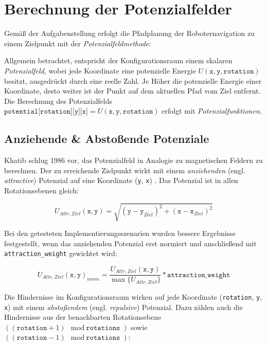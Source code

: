 \chapter{Berechnung der Potenzialfelder}

Gemäß der Aufgabenstellung erfolgt die Pfadplanung der Roboternavigation zu einem Zielpunkt mit der \textit{Potenzialfeldmethode}:

Allgemein betrachtet, entspricht der Konfigurationsraum einem skalaren \textit{Potenzialfeld}, wobei jede Koordinate eine potenzielle Energie $U(\texttt{x}, \texttt{y}, \texttt{rotation})$ besitzt, ausgedrückt durch eine reelle Zahl.
Je Höher die potenzielle Energie einer Koordinate, desto weiter ist der Punkt auf dem aktuellen Pfad vom Ziel entfernt.
\cite{yujiang.2017}
Die Berechnung des Potenzialfelds $\texttt{potential[rotation][y][x]} = U(\texttt{x}, \texttt{y}, \texttt{rotation})$ erfolgt mit \textit{Potenzialfunktionen}.

\section{Anziehende \& Abstoßende Potenziale}

Khatib schlug 1986 vor, das Potenzialfeld in Analogie zu magnetischen Feldern zu berechnen. Der zu erreichende Zielpunkt wirkt mit einem \textit{anziehenden} (engl. \textit{attractive}) Potenzial auf eine Koordinate (\texttt{y}, \texttt{x}) \cite{khatib.1985}. Das Potenzial ist in allen Rotationsebenen gleich:

\begin{equation*}
U_{Attr, Ziel}(\texttt{x}, \texttt{y}) = \sqrt{(\texttt{y} - \texttt{y}_{Ziel})^2 + (\texttt{x} - \texttt{x}_{Ziel})^2}
\end{equation*}

Bei den getesteten Implementierungsszenarien wurden bessere Ergebnisse festgestellt, wenn das anziehenden Potenzial erst normiert und anschließend mit \texttt{attraction\_weight} gewichtet wird:

\begin{equation*}
U_{Attr, Ziel}(\texttt{x}, \texttt{y})_{norm} = \frac{U_{Attr, Ziel}(\texttt{x}, \texttt{y})}{\max \{ U_{Attr, Ziel}\}} * \texttt{attraction\_weight}
\end{equation*}

Die Hindernisse im Konfigurationsraum wirken auf jede Koordinate (\texttt{rotation}, \texttt{y}, \texttt{x}) mit einem \textit{abstoßendem} (engl. \textit{repulsive}) Potenzial. Dazu zählen auch die Hindernisse aus der benachbarten Rotationsebene $((\texttt{rotation} + 1) \mod \texttt{rotations})$ sowie $((\texttt{rotation} - 1) \mod \texttt{rotations})$:

